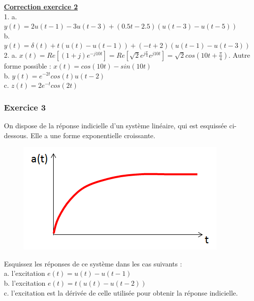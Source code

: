 \documentclass[11pt]{report}
\begin{document}
 	\textbf{\underline{Correction exercice 2}}\\
 	
 	1. a. $y(t)=2u(t-1)-3u(t-3)+(0.5t-2.5)(u(t-3)-u(t-5))$\\
 	
 	b. $y(t)=\delta(t)+t(u(t)-u(t-1))+(-t+2)(u(t-1)-u(t-3))$\\
 	
 	2. a. $x(t)=Re[(1+j)e^{-j10t}]=Re[\sqrt{2}e^{j\frac{\pi}{4}}e^{j10t}]=\sqrt{2}cos(10t+\frac{\pi}{4})$. Autre forme possible : $x(t)=cos(10t)-sin(10t)$\\
 
 	b. $y(t)=e^{-2t}cos(t)u(t-2)$\\
 	
 	c. $z(t)=2e^{-t}cos(2t)$\\
 	
 	\subsubsection{Exercice 3}
 	
 	On dispose de la réponse indicielle d'un système linéaire, qui est esquissée ci-dessous. Elle a une forme exponentielle croissante.\\
 	
 	\begin{figure}[h!]
 		\centering
 		\includegraphics[scale=0.5]{images/Exo_2_3.png} 
 	\end{figure} 
 
 	Esquissez les réponses de ce système dans les cas suivants :\\
 	
 	a. l'excitation $e(t)=u(t)-u(t-1)$\\
 	
 	b. l'excitation $e(t)=t(u(t)-u(t-2))$\\
 	
 	c. l'excitation est la dérivée de celle utilisée pour obtenir la réponse indicielle.\\
 	
\end{document}
